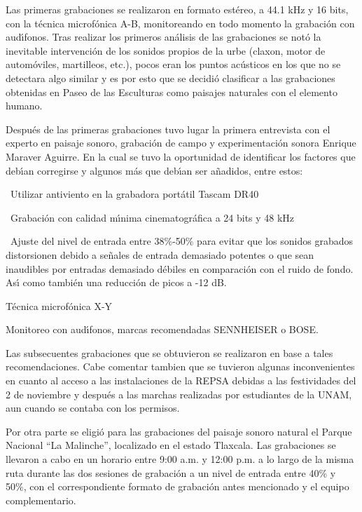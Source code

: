Las primeras grabaciones se realizaron en formato est\'{e}reo, a 44.1 kHz y 16
bits, con la t\'{e}cnica microf\'{o}nica A-B, monitoreando en todo momento la
grabaci\'{o}n con aud\'{\i}fonos. Tras realizar los primeros an\'{a}lisis de
las grabaciones se not\'{o} la inevitable intervenci\'{o}n de los sonidos
propios de la urbe (claxon, motor de autom\'{o}viles, martilleos, etc.), pocos
eran los puntos ac\'{u}sticos en los que no se detectara algo similar y es por
esto que se decidi\'{o} clasificar a las grabaciones obtenidas en Paseo de las
Esculturas como paisajes naturales con el elemento humano.

Despu\'{e}s de las primeras grabaciones tuvo lugar la primera entrevista con
el experto en paisaje sonoro, grabaci\'{o}n de campo y experimentaci\'{o}n
sonora Enrique Maraver Aguirre. En la cual se tuvo la oportunidad de
identificar los factores que deb\'{\i}an corregirse y algunos m\'{a}s que
deb\'{\i}an ser a\~{n}adidos, entre estos:

\textbullet\ Utilizar antiviento en la grabadora port\'{a}til Tascam DR40

\textbullet\ Grabaci\'{o}n con calidad m\'{\i}nima cinematogr\'{a}fica a 24
bits y 48 kHz

\bigskip\textbullet\ Ajuste del nivel de entrada entre 38\%-50\% para evitar
que los sonidos grabados distorsionen debido a se\~{n}ales de entrada
demasiado potentes o que sean inaudibles por entradas demasiado d\'{e}biles en
comparaci\'{o}n con el ruido de fondo. As\'{\i} como tambi\'{e}n una
reducci\'{o}n de picos a -12 dB.

\qquad\textbullet\qquad T\'{e}cnica microf\'{o}nica X-Y

\qquad\textbullet\qquad Monitoreo con aud\'{\i}fonos, marcas recomendadas
SENNHEISER o BOSE.

Las subsecuentes grabaciones que se obtuvieron se realizaron en base a tales
recomendaciones. Cabe comentar tambien que se tuvieron algunas inconvenientes
en cuanto al acceso a las instalaciones de la REPSA debidas a las festividades
del 2 de noviembre y despu\'{e}s a las marchas realizadas por estudiantes de
la UNAM, aun cuando se contaba con los permisos.

Por otra parte se eligi\'{o} para las grabaciones del paisaje sonoro natural
el Parque Nacional \textquotedblleft La Malinche\textquotedblright, localizado
en el estado Tlaxcala. Las grabaciones se llevaron a cabo en un horario entre
9:00 a.m. y 12:00 p.m. a lo largo de la misma ruta durante las dos sesiones de
grabaci\'{o}n a un nivel de entrada entre 40\% y 50\%, con el correspondiente
formato de grabaci\'{o}n antes mencionado y el equipo complementario.

